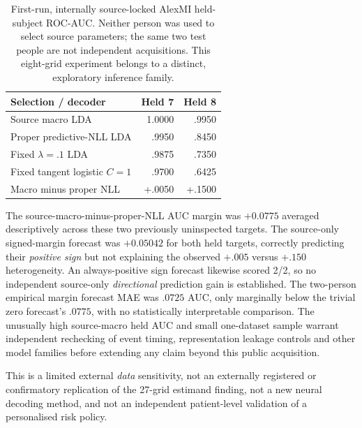 \begin{table}[ht]\centering\small
\caption{First-run, internally source-locked AlexMI
held-subject ROC-AUC. Neither person was used to
select source parameters; the same two test people
are not independent acquisitions. This eight-grid
experiment belongs to a distinct, exploratory
inference family.}
\label{tab:p1-alexmi}
\begin{tabular}{lrr}
\toprule
Selection / decoder & Held 7 & Held 8\\
\midrule
Source macro LDA & 1.0000 & .9950\\
Proper predictive-NLL LDA & .9950 & .8450\\
Fixed $\lambda=.1$ LDA & .9875 & .7350\\
Fixed tangent logistic $C=1$ & .9700 & .6425\\
\midrule
Macro minus proper NLL & +.0050 & +.1500\\
\bottomrule
\end{tabular}
\end{table}
The source-macro-minus-proper-NLL AUC margin was
$+0.0775$ averaged descriptively across these
two previously uninspected targets.
The source-only signed-margin forecast was
$+0.05042$ for both held targets,
correctly predicting their \emph{positive sign}
but not explaining the observed $+.005$ versus
$+.150$ heterogeneity. An always-positive
sign forecast likewise scored 2/2, so no
independent source-only \emph{directional}
prediction gain is established.
The two-person empirical margin forecast
MAE was $.0725$ AUC, only marginally below
the trivial zero forecast's $.0775$, with
no statistically interpretable comparison.
The unusually high source-macro held AUC
and small one-dataset sample warrant
independent rechecking of event timing,
representation leakage controls and other
model families before extending any
claim beyond this public acquisition.

This is a limited external \emph{data}
sensitivity, not an externally registered
or confirmatory replication of the
27-grid estimand finding, not a new
neural decoding method, and not an
independent patient-level validation of
a personalised risk policy.
